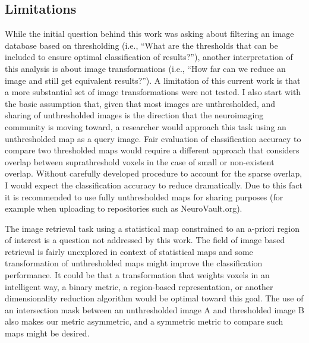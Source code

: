 \documentclass{report}
\begin{document}
\subsection{Limitations}
While the initial question behind this work was asking about filtering
an image database based on thresholding (i.e., ``What are the thresholds
that can be included to ensure optimal classification of results?''),
another interpretation of this analysis is about image transformations
(i.e., ``How far can we reduce an image and still get equivalent
results?''). A limitation of this current work is that a more
substantial set of image transformations were not tested. I also start
with the basic assumption that, given that most images are
unthresholded, and sharing of unthresholded images is the direction that
the neuroimaging community is moving toward, a researcher would approach
this task using an unthresholded map as a query image. Fair evaluation
of classification accuracy to compare two thresholded maps would require
a different approach that considers overlap between suprathreshold
voxels in the case of small or non-existent overlap. Without carefully
developed procedure to account for the sparse overlap, I would expect
the classification accuracy to reduce dramatically. Due to this fact it
is recommended to use fully unthresholded maps for sharing purposes (for
example when uploading to repositories such as NeuroVault.org).

The image retrieval task using a statistical map constrained to an
a-priori region of interest is a question not addressed by this work.
The field of image based retrieval is fairly unexplored in context of
statistical maps and some transformation of unthresholded maps might
improve the classification performance. It could be that a
transformation that weights voxels in an intelligent way, a binary
metric, a region-based representation, or another dimensionality
reduction algorithm would be optimal toward this goal. The use of an
intersection mask between an unthresholded image A and thresholded image B also makes our metric asymmetric, and a symmetric metric to compare
such maps might be desired.
\end{document}
